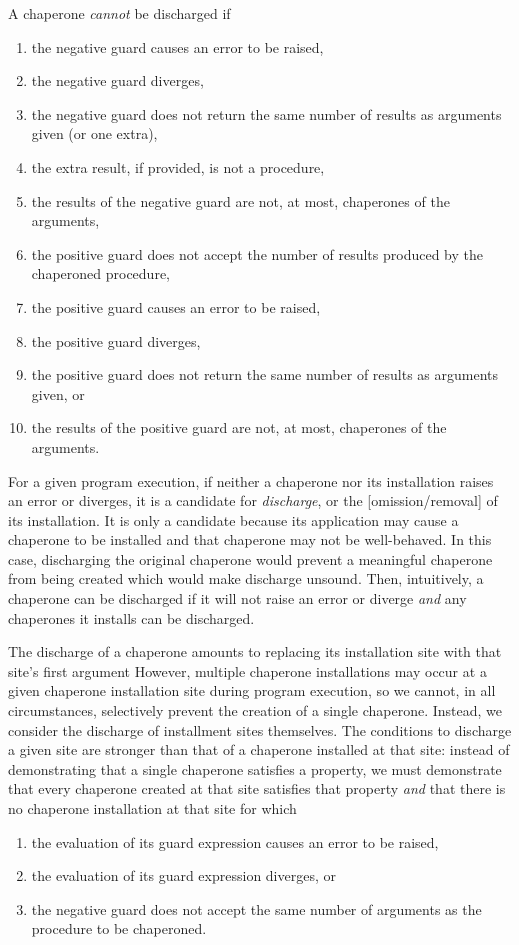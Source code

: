 \documentclass{sigplanconf}
\begin{document}
A chaperone \emph{cannot} be discharged if
\begin{enumerate}
\item the negative guard causes an error to be raised,
\item the negative guard diverges,
\item the negative guard does not return the same number of results as arguments given (or one extra),
\item the extra result, if provided, is not a procedure,
\item the results of the negative guard are not, at most, chaperones of the arguments,
\item the positive guard does not accept the number of results produced by the chaperoned procedure,
\item the positive guard causes an error to be raised,
\item the positive guard diverges,
\item the positive guard does not return the same number of results as arguments given, or
\item the results of the positive guard are not, at most, chaperones of the arguments.
\end{enumerate}

For a given program execution, if neither a chaperone nor its installation raises an error or diverges, it is a candidate for \emph{discharge}, or the [omission/removal] of its installation.
It is only a candidate because its application may cause a chaperone to be installed and that chaperone may not be well-behaved.
In this case, discharging the original chaperone would prevent a meaningful chaperone from being created which would make discharge unsound.
Then, intuitively, a chaperone can be discharged if it will not raise an error or diverge  \emph{and} any chaperones it installs can be discharged.

The discharge of a chaperone amounts to replacing its installation site with that site's first argument
However, multiple chaperone installations may occur at a given chaperone installation site during program execution, so we cannot, in all circumstances, selectively prevent the creation of a single chaperone.
Instead, we consider the discharge of installment sites themselves.
The conditions to discharge a given site are stronger than that of a chaperone installed at that site: instead of demonstrating that a single chaperone satisfies a property, we must demonstrate that every chaperone created at that site satisfies that property \emph{and} that there is no chaperone installation at that site for which
\begin{enumerate}
\item the evaluation of its guard expression causes an error to be raised,
\item the evaluation of its guard expression diverges, or
\item the negative guard does not accept the same number of arguments as the procedure to be chaperoned.
\end{enumerate}
\end{document}
